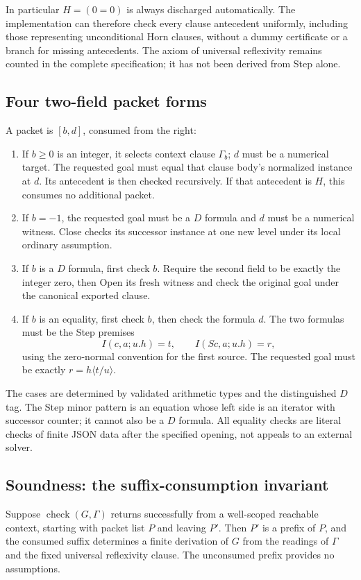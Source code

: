 In particular \(H=(0=0)\) is always discharged automatically.
The implementation can therefore check every clause antecedent
uniformly, including those representing unconditional Horn clauses,
without a dummy certificate or a branch for missing antecedents.
The axiom of universal reflexivity remains counted in the complete
specification; it has not been derived from Step alone.

\subsection{Four two-field packet forms}
A packet is \([b,d]\), consumed from the right:
\begin{enumerate}
\item If \(b\geq0\) is an integer, it selects context clause \(\Gamma_b\);
\(d\) must be a numerical target. The requested goal must equal that
clause body's normalized instance at \(d\). Its antecedent is then
checked recursively. If that antecedent is \(H\), this consumes no
additional packet.
\item If \(b=-1\), the requested goal must be a \(D\) formula and \(d\)
must be a numerical witness. Close checks its successor instance at
one new level under its local ordinary assumption.
\item If \(b\) is a \(D\) formula, first check \(b\). Require the second
field to be exactly the integer zero, then Open its fresh witness and
check the original goal under the canonical exported clause.
\item If \(b\) is an equality, first check \(b\), then check the formula
\(d\). The two formulas must be the Step premises
\[
 I(c,a;u.h)=t,\qquad I(Sc,a;u.h)=r,
\]
using the zero-normal convention for the first source. The requested
goal must be exactly \(r=h\langle t/u\rangle\).
\end{enumerate}
The cases are determined by validated arithmetic types and the
distinguished \(D\) tag. The Step minor pattern is an equation whose
left side is an iterator with successor counter; it cannot also be a
\(D\) formula. All equality checks are literal checks of finite JSON
data after the specified opening, not appeals to an external solver.

\subsection{Soundness: the suffix-consumption invariant}
Suppose \(\operatorname{check}(G,\Gamma)\) returns successfully from a
well-scoped reachable context, starting with packet list \(P\) and
leaving \(P'\). Then \(P'\) is a prefix of \(P\), and the consumed suffix
determines a finite derivation of \(G\) from the readings of \(\Gamma\)
and the fixed universal reflexivity clause. The unconsumed prefix
provides no assumptions.

